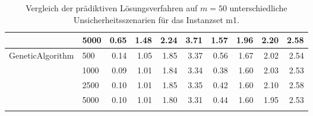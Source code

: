 {\begin{longtable}{ll|rrrr|rrrr}
                 & 5000 & 0.65 & 1.48 & 2.24 & 3.71 & 1.57 & 1.96 & 2.20 & 2.58 \\ \hline
GeneticAlgorithm & 500  & 0.14 & 1.05 & 1.85 & 3.37 & 0.56 & 1.67 & 2.02 & 2.54 \\
                 & 1000 & 0.09 & 1.01 & 1.84 & 3.34 & 0.38 & 1.60 & 2.03 & 2.53 \\
                 & 2500 & 0.10 & 1.01 & 1.85 & 3.35 & 0.42 & 1.60 & 2.10 & 2.58 \\
                 & 5000 & 0.10 & 1.01 & 1.80 & 3.31 & 0.44 & 1.60 & 1.95 & 2.53 \\
\bottomrule
\caption{Vergleich der prädiktiven Lösungsverfahren auf $m=50$ unterschiedliche Unsicherheitsszenarien für das Instanzset m1. }
\label{tab:evaluation_predictive_m1}
\end{longtable}
}
\vspace*{-20px}
\begin{figure}[H]
\end{figure}

